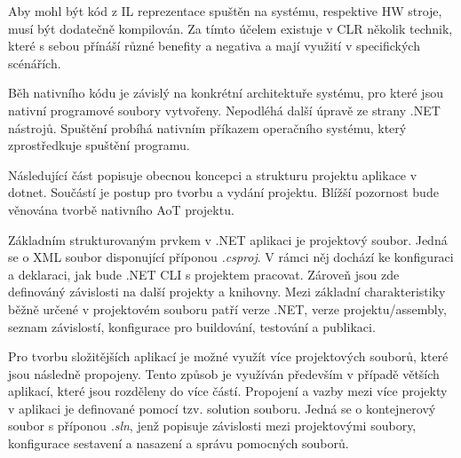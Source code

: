 Aby mohl být kód z IL reprezentace spuštěn na systému, respektive HW stroje, musí být dodatečně kompilován. Za tímto účelem existuje v CLR několik technik, které s sebou přínáší různé benefity a negativa a mají využití v specifických scénářích.


Běh nativního kódu je závislý na konkrétní architektuře systému, pro které jsou nativní programové soubory vytvořeny. Nepodléhá další úpravě ze strany .NET nástrojů. Spuštění probíhá nativním příkazem operačního systému, který zprostředkuje spuštění programu.


Následující část popisuje obecnou koncepci a strukturu projektu aplikace v dotnet. Součástí je postup pro tvorbu a vydání projektu. Blížší pozornost bude věnována tvorbě nativního AoT projektu.


Základním strukturovaným prvkem v .NET aplikaci je projektový soubor. Jedná se o XML soubor disponující příponou \emph{.csproj}. V rámci něj dochází ke konfiguraci a deklaraci, jak bude .NET CLI s projektem pracovat. Zároveň jsou zde definováný závislosti na další projekty a knihovny. Mezi základní charakteristiky běžně určené v projektovém souboru patří verze .NET, verze projektu/assembly, seznam závislostí, konfigurace pro buildování, testování a publikaci.

Pro tvorbu složitějších aplikací je možné využít více projektových souborů, které jsou následně propojeny. Tento způsob je využíván především v případě větších aplikací, které jsou rozděleny do více částí. Propojení a vazby mezi více projekty v aplikaci je definované pomocí tzv. solution souboru. Jedná se o kontejnerový soubor s příponou \emph{.sln}, jenž popisuje závislosti mezi projektovými soubory, konfigurace sestavení a nasazení a správu pomocných souborů.


